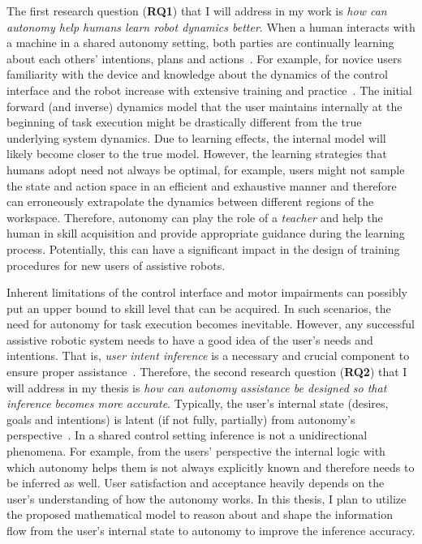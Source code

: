 \documentclass[12pt]{article}
\begin{document}
The first research question (\textbf{RQ1}) that I will address in my work is \textit{how can autonomy help humans learn robot dynamics better}. When a human interacts with a machine in a shared autonomy setting, both parties are continually learning about each others' intentions, plans and actions~\cite{ikemoto2012physical}. For example, for novice users familiarity with the device and knowledge about the dynamics of the control interface and the robot increase with extensive training and practice~\cite{mussaivaldi2000motor}. The initial forward (and inverse) dynamics model that the user maintains internally at the beginning of task execution might be drastically different from the true underlying system dynamics. Due to learning effects, the internal model will likely become closer to the true model. However, the learning strategies that humans adopt need not always be optimal, for example, users might not sample the state and action space in an efficient and exhaustive manner and therefore can erroneously extrapolate the dynamics between different regions of the workspace. Therefore, autonomy can play the role of a \textit{teacher} and help the human in skill acquisition and provide appropriate guidance during the learning process. Potentially, this can have a significant impact in the design of training procedures for new users of assistive robots.

Inherent limitations of the control interface and motor impairments can possibly put an upper bound to skill level that can be acquired. In such scenarios, the need for autonomy for task execution becomes inevitable. However, any successful assistive robotic system needs to have a good idea of the user's needs and intentions. That is, \textit{user intent inference} is a necessary and crucial component to ensure proper assistance~\cite{wang2013probabilistic}. Therefore, the second research question (\textbf{RQ2}) that I will address in my thesis is \textit{how can autonomy assistance be designed so that inference becomes more accurate}. Typically, the user's internal state (desires, goals and intentions) is latent (if not fully, partially) from autonomy's perspective~\cite{kelley2008understanding}. In a shared control setting inference is not a unidirectional phenomena. For example, from the users' perspective the internal logic with which autonomy helps them is not always explicitly known and therefore needs to be inferred as well. User satisfaction and acceptance heavily depends on the user's understanding of how the autonomy works. In this thesis, I plan to utilize the proposed mathematical model to reason about and shape the information flow from the user's internal state to autonomy to improve the inference accuracy. 
\end{document}
